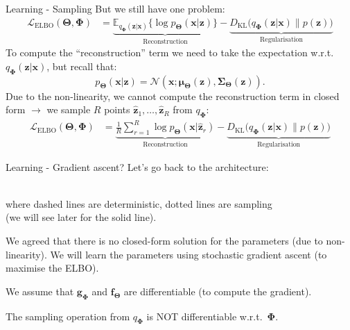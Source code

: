 \documentclass{beamer}
\newcommand{\MN}{{\mathcal N}}
\newcommand{\bs}[1]{\boldsymbol{#1}}
\begin{document}
\begin{frame}{Learning - Sampling}
 But we still have one problem:
 \begin{align}
  \mathcal{L}_{\text{ELBO}}(\bs{\Theta},\bs{\Phi}) &= \underbrace{\mathbb{E}_{q_{\bs{\Phi}}(\bs{z}|\bs{x})}\Big\{\log p_{\bs{\Theta}}(\bs{x}|\bs{z})\Big\}}_{\text{Reconstruction}} -  \underbrace{D_{\text{KL}}\Big(q_{\bs{\Phi}}(\bs{z}|\bs{x})\Big\lVert p(\bs{z})\Big)}_{\text{Regularisation}}
\end{align}
To compute the ``reconstruction'' term we need to take the expectation w.r.t.\ $q_{\bs{\Phi}}(\bs{z}|\bs{x})$, but recall that:
\begin{equation}
  p_{\bs{\Theta}}(\bs{x}|\bs{z}) = \MN(\bs{x};\bs{\mu}_{\bs{\Theta}}(\bs{z}),\bs{\Sigma}_{\bs{\Theta}}(\bs{z})).
\end{equation}
Due to the non-linearity, we cannot compute the reconstruction term in closed form $\rightarrow$ we sample $R$ points $\hat{\bs{z}}_1,\ldots,\hat{\bs{z}}_R$ from $q_{\bs{\Phi}}$:
 \begin{align}
  \mathcal{L}_{\text{ELBO}}(\bs{\Theta},\bs{\Phi}) &= \underbrace{\frac{1}{R}\sum_{r=1}^R\log p_{\bs{\Theta}}(\bs{x}|\hat{\bs{z}}_r)}_{\text{Reconstruction}} -  \underbrace{D_{\text{KL}}\Big(q_{\bs{\Phi}}(\bs{z}|\bs{x})\Big\lVert p(\bs{z})\Big)}_{\text{Regularisation}}
\end{align}
\end{frame}

\begin{frame}{Learning - Gradient ascent?}
  Let's go back to the architecture:\vspace{3mm}
   \\
  where dashed lines are deterministic, dotted lines are sampling\\ (we will see later for the solid line).\vspace{3mm}
  
  We agreed that there is no closed-form solution for the parameters (due to non-linearity). We will learn the parameters using stochastic gradient ascent (to maximise the ELBO).\vspace{3mm}
  
  We assume that $\bs{g}_{\bs{\Phi}}$ and $\bs{f}_{\bs{\Theta}}$ are differentiable (to compute the gradient).\vspace{3mm}
  
  The sampling operation from $q_{\bs{\Phi}}$ is {\color{red}NOT} differentiable w.r.t.\ $\bs{\Phi}$.
\end{frame}
\end{document}
